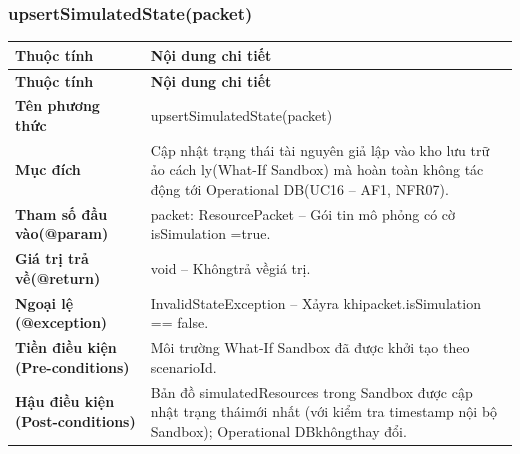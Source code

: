 \subsubsection{upsertSimulatedState(packet)}
\begin{longtable}{|L{0.24\textwidth}|L{0.70\textwidth}|}
\hline
\textbf{Thuộc tính} & \textbf{Nội dung chi tiết} \\
\hline
\endfirsthead
\hline
\textbf{Thuộc tính} & \textbf{Nội dung chi tiết} \\
\hline
\endhead
\textbf{Tên phương thức} & upsertSimulatedState(packet) \\
\hline
\textbf{Mục đích} & Cập nhật trạng thái tài nguyên giả lập vào kho lưu trữ ảo cách ly\newline (What-If Sandbox) mà hoàn toàn không tác động tới Operational DB\newline (UC16 – AF1, NFR07). \\
\hline
\textbf{Tham số đầu vào}\newline \textbf{(@param)} & packet: ResourcePacket – Gói tin mô phỏng có cờ isSimulation =\newline true. \\
\hline
\textbf{Giá trị trả về(@return)} & void – Khôngtrả vềgiá trị. \\
\hline
\textbf{Ngoại lệ (@exception)} & InvalidStateException – Xảyra khipacket.isSimulation == false. \\
\hline
\textbf{Tiền điều kiện (Pre-}\newline \textbf{conditions)} & Môi trường What-If Sandbox đã được khởi tạo theo scenarioId. \\
\hline
\textbf{Hậu điều kiện (Post-}\newline \textbf{conditions)} & Bản đồ simulatedResources trong Sandbox được cập nhật trạng thái\newline mới nhất (với kiểm tra timestamp nội bộ Sandbox); Operational DB\newline khôngthay đổi. \\
\hline
\end{longtable}
\vspace{-0.5\baselineskip}
